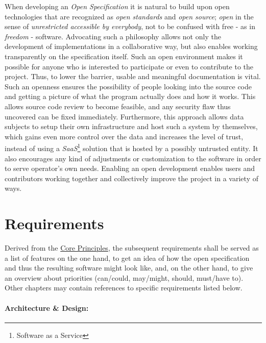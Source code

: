 \documentclass[12pt,english,a4paper,titlepage,cleardoublepage=empty,dottedtoc]{report}
\begin{document}
When developing an \emph{Open Specification} it is natural to build upon
open technologies that are recognized as \emph{open standards} and
\emph{open source}; \emph{open} in the sense of \emph{unrestricted
accessible by everybody}, not to be confused with free - as in
\emph{freedom} - software. Advocating such a philosophy allows not only
the development of implementations in a collaborative way, but also
enables working transparently on the specification itself. Such an open
environment makes it possible for anyone who is interested to
participate or even to contribute to the project. Thus, to lower the
barrier, usable and meaningful documentation is vital. Such an openness
ensures the possibility of people looking into the source code and
getting a picture of what the program actually does and how it works.
This allows source code review to become feasible, and any security flaw
thus uncovered can be fixed immediately. Furthermore, this approach
allows data subjects to setup their own infrastructure and host such a
system by themselves, which gains even more control over the data and
increases the level of trust, instead of using a \emph{SaaS}\footnote{Software
  as a Service} solution that is hosted by a possibly untrusted entity.
It also encourages any kind of adjustments or customization to the
software in order to serve operator's own needs. Enabling an open
development enables users and contributors working together and
collectively improve the project in a variety of ways.

\hypertarget{requirements}{\chapter{Requirements}\label{requirements}}

Derived from the \protect\hyperlink{core-principles}{Core Principles},
the subsequent requirements shall be served as a list of features on the
one hand, to get an idea of how the open specification and thus the
resulting software might look like, and, on the other hand, to give an
overview about priorities (can/could, may/might, should, must/have to).
Other chapters may contain references to specific requirements listed
below.

\subsubsection*{Architecture \& Design:}\label{architecture-design}
\end{document}
